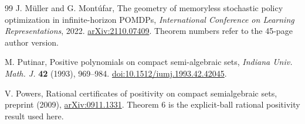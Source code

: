 \begin{thebibliography}{99}
J. M\"uller and G. Mont\'ufar, The geometry of memoryless stochastic
policy optimization in infinite-horizon POMDPs,
\emph{International Conference on Learning Representations}, 2022.
\href{https://arxiv.org/abs/2110.07409}{arXiv:2110.07409}.
Theorem numbers refer to the 45-page author version.

M. Putinar, Positive polynomials on compact semi-algebraic sets,
\emph{Indiana Univ. Math. J.} \textbf{42} (1993), 969--984.
\href{https://doi.org/10.1512/iumj.1993.42.42045}{doi:10.1512/iumj.1993.42.42045}.

V. Powers, Rational certificates of positivity on compact semialgebraic
sets, preprint (2009),
\href{https://arxiv.org/abs/0911.1331}{arXiv:0911.1331}.
Theorem 6 is the explicit-ball rational positivity result used here.

\end{thebibliography}
